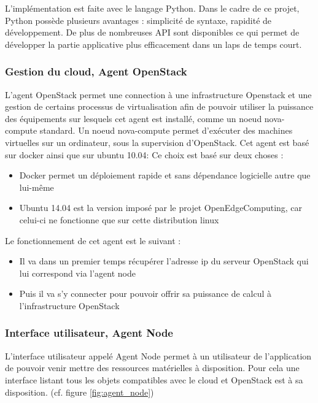 \documentclass[twocolumn,a4paper]{IEEEtranfr}
\begin{document}
L’implémentation est faite avec le langage Python. Dans le cadre de ce projet, Python possède plusieurs avantages : simplicité de syntaxe, rapidité de développement. De plus de nombreuses API sont disponibles ce qui permet de développer la partie applicative plus efficacement dans un laps de temps court.

\subsubsection{Gestion du cloud, Agent OpenStack}

L’agent OpenStack permet une connection à une infrastructure Openstack et une gestion de certains processus de virtualisation afin de pouvoir utiliser la puissance des équipements sur lesquels cet agent est installé, comme un noeud nova-compute standard. Un noeud nova-compute permet d'exécuter des machines virtuelles sur un ordinateur, sous la supervision d’OpenStack. Cet agent est basé sur docker ainsi que sur ubuntu 10.04:
Ce choix est basé sur deux choses :

\begin{itemize}
	\item Docker permet un déploiement rapide et sans dépendance logicielle autre que lui-même
	\item Ubuntu 14.04 est la version imposé par le projet OpenEdgeComputing, car celui-ci ne fonctionne que sur cette distribution linux
\end{itemize}

Le fonctionnement de cet agent est le suivant : 
\begin{itemize}
	\item Il va dans un premier temps récupérer l’adresse ip du serveur OpenStack qui lui correspond via l’agent node
	\item Puis il va s’y connecter pour pouvoir offrir sa puissance de calcul à l’infrastructure OpenStack
\end{itemize}
\subsubsection{Interface utilisateur, Agent Node}

L’interface utilisateur appelé Agent Node permet à un utilisateur de l’application de pouvoir venir mettre des ressources matérielles à disposition. Pour cela une interface listant tous les objets compatibles avec le cloud et OpenStack est à sa disposition. (cf. figure \ref{fig:agent_node})
\end{document}
